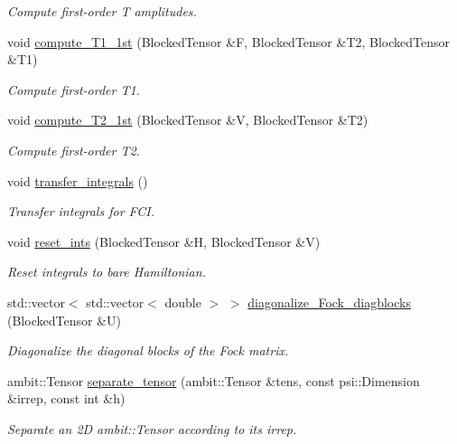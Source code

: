 \begin{DoxyCompactItemize}
\begin{DoxyCompactList}\small\item\em Compute first-\/order T amplitudes. \end{DoxyCompactList}\item 
void \mbox{\hyperlink{classforte_1_1_d_s_r_g___m_r_p_t_a886819be6edca8bb76c94dd45fa6dd04}{compute\+\_\+\+T1\+\_\+1st}} (Blocked\+Tensor \&F, Blocked\+Tensor \&T2, Blocked\+Tensor \&T1)
\begin{DoxyCompactList}\small\item\em Compute first-\/order T1. \end{DoxyCompactList}\item 
void \mbox{\hyperlink{classforte_1_1_d_s_r_g___m_r_p_t_a8bf372f9bd6f54b553355c4eb575214d}{compute\+\_\+\+T2\+\_\+1st}} (Blocked\+Tensor \&V, Blocked\+Tensor \&T2)
\begin{DoxyCompactList}\small\item\em Compute first-\/order T2. \end{DoxyCompactList}\item 
void \mbox{\hyperlink{classforte_1_1_d_s_r_g___m_r_p_t_a778596d63e6d421f2bb21f18982b7b20}{transfer\+\_\+integrals}} ()
\begin{DoxyCompactList}\small\item\em Transfer integrals for F\+CI. \end{DoxyCompactList}\item 
void \mbox{\hyperlink{classforte_1_1_d_s_r_g___m_r_p_t_adcf156a0f6b3caa2637d743789b9c68e}{reset\+\_\+ints}} (Blocked\+Tensor \&H, Blocked\+Tensor \&V)
\begin{DoxyCompactList}\small\item\em Reset integrals to bare Hamiltonian. \end{DoxyCompactList}\item 
std\+::vector$<$ std\+::vector$<$ double $>$ $>$ \mbox{\hyperlink{classforte_1_1_d_s_r_g___m_r_p_t_a443bd826e0384c8f5d2ed562e10e4867}{diagonalize\+\_\+\+Fock\+\_\+diagblocks}} (Blocked\+Tensor \&U)
\begin{DoxyCompactList}\small\item\em Diagonalize the diagonal blocks of the Fock matrix. \end{DoxyCompactList}\item 
ambit\+::\+Tensor \mbox{\hyperlink{classforte_1_1_d_s_r_g___m_r_p_t_ada139ac0e12cbee87aacb94af7510868}{separate\+\_\+tensor}} (ambit\+::\+Tensor \&tens, const psi\+::\+Dimension \&irrep, const int \&h)
\begin{DoxyCompactList}\small\item\em Separate an 2D ambit\+::\+Tensor according to its irrep. \end{DoxyCompactList}\item 

\end{DoxyCompactItemize}
